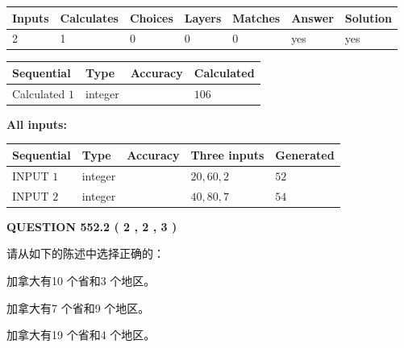 \documentclass{ctexart}
\begin{document}
   
\noindent\begin{tabular}{|l|l|l|l|l|l|l|}
 \hline
Inputs & Calculates & Choices & Layers & Matches & Answer & Solution \\ \hline
 2  & 
 1  & 
 0
  & 
 0  & 
 0  & 
  yes & 
  yes 
  \\ \hline
 \end{tabular}
   
   
   
   
\noindent{}
   
   
  
  
\noindent\begin{tabular}{|l|l|l|l|}
\hline
 Sequential & Type & Accuracy & Calculated \\ 
\hline
 
 
  Calculated $  1 $ & integer &  & 
  $ 106 $ 
 \\  \hline  
 \end{tabular}
   
   
   
   
\noindent\vspace{0.1in}\hspace{-0.08in} {\textbf{\Large{All inputs: }}}
   
   
  
  
\noindent\begin{tabular}{|l|l|l|l|l|}
\hline
 Sequential & Type & Accuracy & Three inputs & Generated \\ 
\hline
 
 
  INPUT $  1 $ & integer &  & $
 20
 , 
 60
 , 
 2
 $ & $ 52 $ 
 \\  \hline  
 
 
  INPUT $  2 $ & integer &  & $
 40
 , 
 80
 , 
 7
 $ & $ 54 $ 
 \\  \hline  
 \end{tabular}
   
   
  
\vspace{0.2in}
  
{\textbf{\Large{QUESTION
552.2 
 ( 2 , 2 , 3 )
}}}
  
  
请从如下的陈述中选择正确的：
 
 
加拿大有10 个省和3 个地区。
 
 
加拿大有7 个省和9 个地区。
 
 
加拿大有19 个省和4 个地区。
 
\end{document}
